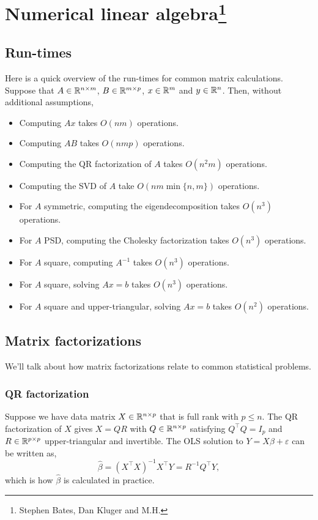 \section{Numerical linear algebra\footnote{Stephen Bates, Dan Kluger and M.H.}}

\subsection{Run-times}

Here is a quick overview of the run-times for common matrix calculations. Suppose that $A \in \mathbb{R}^{n \times m}$, $B \in \mathbb{R}^{m \times p}$, $x \in \mathbb{R}^m$ and $y \in \mathbb{R}^n$. Then, without additional assumptions,
\begin{itemize}
    \item Computing $Ax$ takes $O(nm)$ operations.
    \item Computing $AB$ takes $O(nmp)$ operations.
    \item Computing the QR factorization of $A$ takes $O(n^2m)$ operations.
    \item Computing the SVD of $A$ take $O(nm\min\{n,m\})$ operations.
    \item For $A$ symmetric, computing the eigendecomposition takes $O(n^3)$ operations.
    \item For $A$ PSD, computing the Cholesky factorization takes $O(n^3)$ operations.
    \item For $A$ square, computing $A^{-1}$ takes $O(n^3)$ operations.
    \item For $A$ square, solving $Ax = b$ takes $O(n^3)$ operations. 
    \item For $A$ square and upper-triangular, solving $Ax = b$ takes $O(n^2)$ operations.
\end{itemize}

\subsection{Matrix factorizations}

We'll talk about how matrix factorizations relate to common statistical problems. 

\subsubsection*{QR factorization}

 Suppose we have data matrix $X \in \mathbb{R}^{n \times p}$ that is full rank with $p \le n$. The QR factorization of $X$ gives $X = QR$ with $Q \in \mathbb{R}^{n \times p}$ satisfying $Q^\top Q = I_p$ and $R \in \mathbb{R}^{p \times p}$ upper-triangular and invertible. The OLS solution to $Y=X\beta + \varepsilon$ can be written as,
\[\hat{\beta} = (X^\top X)^{-1}X^\top Y = R^{-1}Q^\top Y, \]
which is how $\hat{\beta}$ is calculated in practice. 

